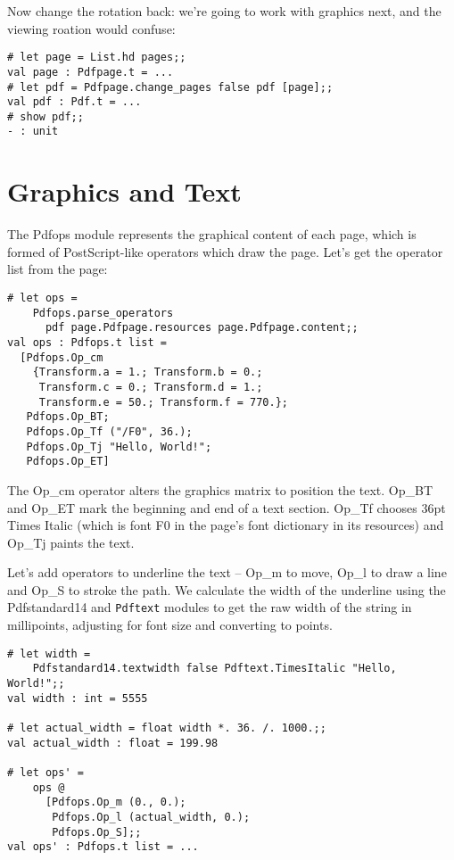 \documentclass[a4paper]{memoir}
\begin{document}
\noindent Now change the rotation back: we're going to work with graphics next, and the viewing roation would confuse:
\begin{framed}
\small\begin{verbatim}
# let page = List.hd pages;;
val page : Pdfpage.t = ...
# let pdf = Pdfpage.change_pages false pdf [page];;
val pdf : Pdf.t = ...
# show pdf;;
- : unit
\end{verbatim}
\end{framed}
\section*{Graphics and Text}
The \textsf{Pdfops} module represents the graphical content of each page, which is formed of PostScript-like operators which draw the page. Let's get the operator list from the page:
\begin{framed}
\small\begin{verbatim}
# let ops =
    Pdfops.parse_operators
      pdf page.Pdfpage.resources page.Pdfpage.content;;
val ops : Pdfops.t list =
  [Pdfops.Op_cm
    {Transform.a = 1.; Transform.b = 0.;
     Transform.c = 0.; Transform.d = 1.;
     Transform.e = 50.; Transform.f = 770.};
   Pdfops.Op_BT;
   Pdfops.Op_Tf ("/F0", 36.);
   Pdfops.Op_Tj "Hello, World!";
   Pdfops.Op_ET]
\end{verbatim}
\end{framed}
\noindent The \textsf{Op\_cm} operator alters the graphics matrix to position the text. \textsf{Op\_BT} and \textsf{Op\_ET} mark the beginning and end of a text section. \textsf{Op\_Tf} chooses 36pt Times Italic (which is font \textsf{F0} in the page's font dictionary in its resources) and \textsf{Op\_Tj} paints the text.

Let's add operators to underline the text -- \textsf{Op\_m} to move, \textsf{Op\_l} to draw a line and \textsf{Op\_S} to stroke the path. We calculate the width of the underline using the \textsf{Pdfstandard14} and \texttt{Pdftext} modules to get the raw width of the string in millipoints, adjusting for font size and converting to points.

\begin{framed}
\small\begin{verbatim}
# let width =
    Pdfstandard14.textwidth false Pdftext.TimesItalic "Hello, World!";;
val width : int = 5555

# let actual_width = float width *. 36. /. 1000.;;
val actual_width : float = 199.98

# let ops' =
    ops @
      [Pdfops.Op_m (0., 0.);
       Pdfops.Op_l (actual_width, 0.);
       Pdfops.Op_S];;
val ops' : Pdfops.t list = ...
\end{verbatim}
\end{framed}
\end{document}
